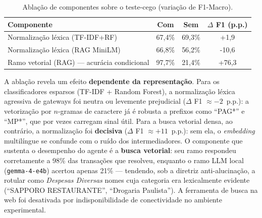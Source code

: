 \begin{table}[htb]
	\centering
	\caption{Ablação de componentes sobre o teste-cego (variação de F1-Macro).}
	\label{tab:ablacao}
	\begin{tabularx}{\textwidth}{X c c c}
		\toprule
		\textbf{Componente} & \textbf{Com} & \textbf{Sem} & \textbf{$\Delta$ F1 (p.p.)} \\
		\midrule
		Normalização léxica (TF-IDF+RF) & 67,4\% & 69,3\% & +1,9 \\
		Normalização léxica (RAG MiniLM) & 66,8\% & 56,2\% & -10,6 \\
		Ramo vetorial (RAG) — acurácia condicional & 97,7\% & 21,4\% & +76,3 \\
		\bottomrule
	\end{tabularx}
\end{table}


A ablação revela um efeito \textbf{dependente da representação}. Para os classificadores
esparsos (TF-IDF + Random Forest), a normalização léxica agressiva de gateways foi
neutra ou levemente prejudicial ($\Delta$ F1 $\approx -2$~p.p.): a vetorização por
$n$-gramas de caractere já é robusta a prefixos como ``PAG*'' e ``MP*'', que por vezes
carregam sinal útil. Para a busca vetorial densa, ao contrário, a normalização foi
\textbf{decisiva} ($\Delta$ F1 $\approx +11$~p.p.): sem ela, o \textit{embedding}
multilíngue se confunde com o ruído dos intermediadores. O componente que sustenta o
desempenho do agente é a \textbf{busca vetorial}: seu ramo respondeu corretamente a
98\% das
transações que resolveu, enquanto o ramo LLM local (\texttt{gemma-4-e4b}) acertou apenas
21\% ---
tendendo, sob a diretriz anti-alucinação, a rotular como \textit{Despesas Diversas}
nomes cuja categoria era lexicalmente evidente (``SAPPORO RESTAURANTE'', ``Drogaria
Paulista''). A ferramenta de busca na web foi desativada por indisponibilidade de
conectividade no ambiente experimental.
